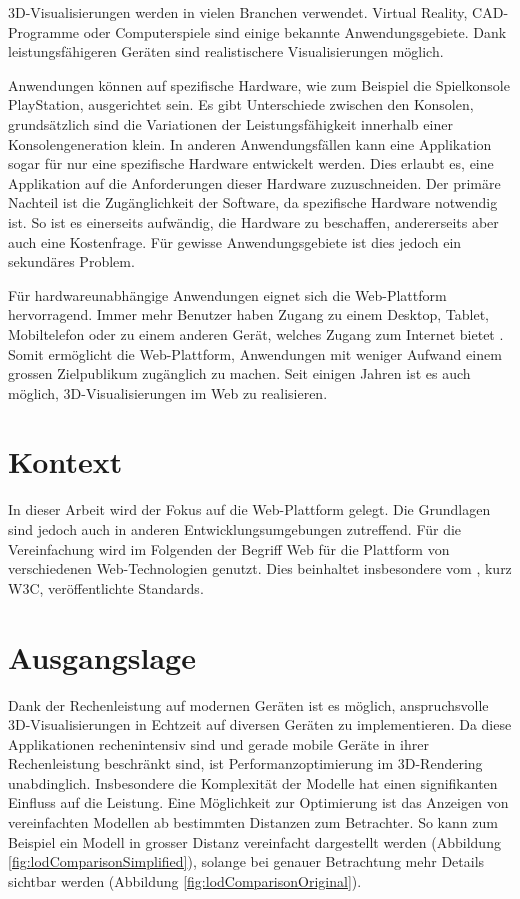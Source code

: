 
3D-Visualisierungen werden in vielen Branchen verwendet. Virtual Reality, CAD-Programme oder Computerspiele sind einige bekannte Anwendungsgebiete. Dank leistungsfähigeren Geräten sind realistischere Visualisierungen möglich.

Anwendungen können auf spezifische Hardware, wie zum Beispiel die Spielkonsole PlayStation, ausgerichtet sein. Es gibt Unterschiede zwischen den Konsolen, grundsätzlich sind die Variationen der Leistungsfähigkeit innerhalb einer Konsolengeneration klein. In anderen Anwendungsfällen kann eine Applikation sogar für nur eine spezifische Hardware entwickelt werden. Dies erlaubt es, eine Applikation auf die Anforderungen dieser Hardware zuzuschneiden. Der primäre Nachteil ist die Zugänglichkeit der Software, da spezifische Hardware notwendig ist. So ist es einerseits aufwändig, die Hardware zu beschaffen, andererseits aber auch eine Kostenfrage. Für gewisse Anwendungsgebiete ist dies jedoch ein sekundäres Problem.

Für hardwareunabhängige Anwendungen eignet sich die Web-Plattform hervorragend.
Immer mehr Benutzer haben Zugang zu einem Desktop, Tablet, Mobiltelefon oder zu einem anderen Gerät, welches Zugang zum Internet bietet \cite{peopleWithInternetAccess}.
Somit ermöglicht die Web-Plattform, Anwendungen mit weniger Aufwand einem grossen Zielpublikum zugänglich zu machen.
Seit einigen Jahren ist es auch möglich, 3D-Visualisierungen im Web zu realisieren.

\section{Kontext}
In dieser Arbeit wird der Fokus auf die Web-Plattform gelegt. Die Grundlagen sind jedoch auch in anderen Entwicklungsumgebungen zutreffend.
Für die Vereinfachung wird im Folgenden der Begriff Web für die Plattform von verschiedenen Web-Technologien genutzt. Dies beinhaltet insbesondere vom , kurz W3C, veröffentlichte Standards.

\section{Ausgangslage}
Dank der Rechenleistung auf modernen Geräten ist es möglich, anspruchsvolle 3D-Visualisierungen in Echtzeit auf diversen Geräten zu implementieren. Da diese Applikationen rechenintensiv sind und gerade mobile Geräte in ihrer Rechenleistung beschränkt sind, ist Performanzoptimierung im 3D-Rendering unabdinglich. Insbesondere die Komplexität der Modelle hat einen signifikanten Einfluss auf die Leistung.
Eine Möglichkeit zur Optimierung ist das Anzeigen von vereinfachten Modellen ab bestimmten Distanzen zum Betrachter. So kann zum Beispiel ein Modell in grosser Distanz vereinfacht dargestellt werden (Abbildung \ref{fig:lodComparisonSimplified}), solange bei genauer Betrachtung mehr Details sichtbar werden (Abbildung \ref{fig:lodComparisonOriginal}).

